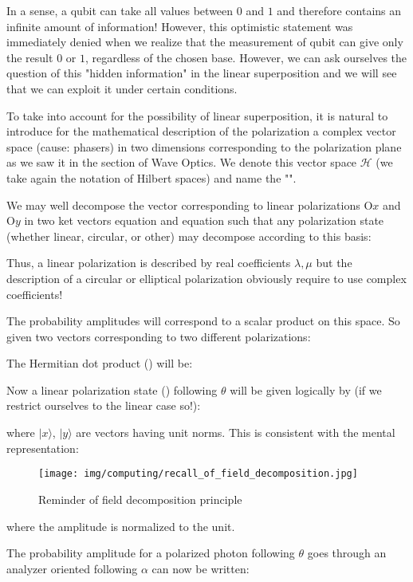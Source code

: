 	In a sense, a qubit can take all values between $0$ and $1$ and therefore contains an infinite amount of information! However, this optimistic statement was immediately denied when we realize that the measurement of qubit can give only the result $0$ or $1$, regardless of the chosen base. However, we can ask ourselves the question of this "hidden information" in the linear superposition and we will see that we can exploit it under certain conditions.
	
	To take into account for the possibility of linear superposition, it is natural to introduce for the mathematical description of the polarization a complex vector space (cause: phasers) in two dimensions corresponding to the polarization plane as we saw it in the section of Wave Optics. We denote this vector space $\mathcal{H}$ (we take again the notation of Hilbert spaces) and name the "".

	We may well decompose the vector corresponding to linear polarizations O$x$ and O$y$ in two ket vectors equation and equation such that any polarization state (whether linear, circular, or other) may decompose according to this basis:
	
	Thus, a linear polarization is described by real coefficients $\lambda,\mu$ but the description of a circular or elliptical polarization obviously require to use complex coefficients!

	The probability amplitudes will correspond to a scalar product on this space. So given two vectors corresponding to two different polarizations:
	
	The Hermitian dot product () will be:
	
	Now a linear polarization state () following $\theta$ will be given logically  by (if we restrict ourselves to the linear case so!):
	
	where $|x\rangle$, $|y\rangle$ are vectors having unit norms. This is consistent with the mental representation:
	\begin{figure}[H]
		\centering
		\texttt{[image: img/computing/recall\_of\_field\_decomposition.jpg]}
		\caption[]{Reminder of field decomposition principle}
	\end{figure}
	where the amplitude is normalized to the unit.

	The probability amplitude for a polarized photon following $\theta$ goes through an analyzer oriented following $\alpha$ can now be written:
	
